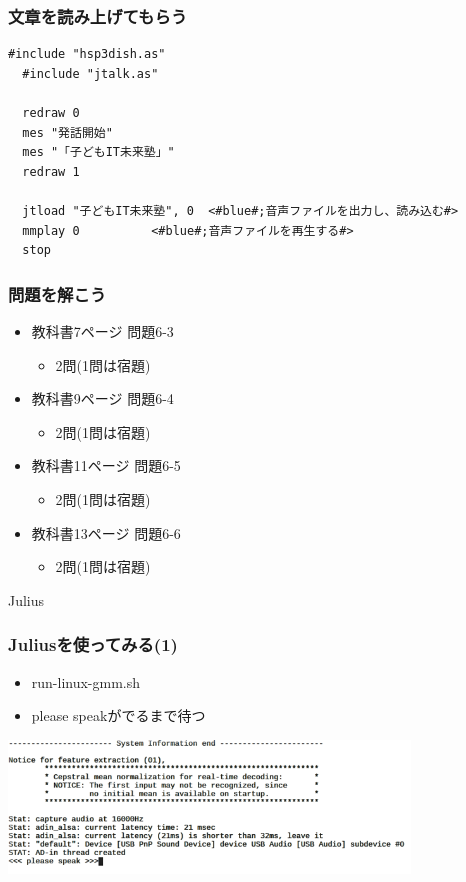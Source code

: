 \documentclass[14pt]{beamer}
\begin{document}
\begin{frame}[fragile]
  \frametitle{文章を読み上げてもらう}
  
  \begin{lstlisting}[title=openjtalk.hsp,label=openjtalk.hsp]
  #include "hsp3dish.as"
  #include "jtalk.as"

  redraw 0
  mes "発話開始"
  mes "「子どもIT未来塾」"
  redraw 1

  jtload "子どもIT未来塾", 0	<#blue#;音声ファイルを出力し、読み込む#>
  mmplay 0			<#blue#;音声ファイルを再生する#>
  stop
  \end{lstlisting}
\end{frame}

\begin{frame}
  \frametitle{問題を解こう}
  \begin{itemize}
    \item 教科書7ページ 問題6-3
    \begin{itemize}
      \item 2問(1問は宿題)
    \end{itemize}
    \item 教科書9ページ 問題6-4
    \begin{itemize}
      \item 2問(1問は宿題)
    \end{itemize}
    \item 教科書11ページ 問題6-5
    \begin{itemize}
      \item 2問(1問は宿題)
    \end{itemize}
    \item 教科書13ページ 問題6-6
    \begin{itemize}
      \item 2問(1問は宿題)
    \end{itemize}
  \end{itemize}
  
\end{frame}

\begin{frame}
  \centering
  {\Large Julius}
\end{frame}

\begin{frame}
  \frametitle{Juliusを使ってみる(1)}
  \begin{itemize}
    \item run-linux-gmm.sh
    \item \<\<please speak\>\>がでるまで待つ
  \end{itemize}
  \centering
  \includegraphics[width=0.8\textwidth]{chap06/text06-img009.png}
\end{frame}
\end{document}
